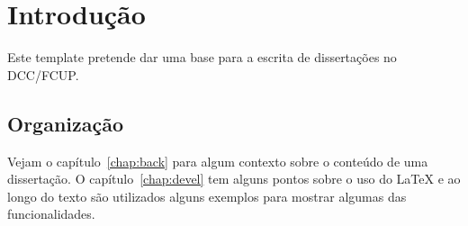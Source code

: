 \chapter{Introdução}\label{chap:intro}

Este template pretende dar uma base para a escrita de dissertações no \ac{DCC}/\ac{FCUP}.

\section{Organização}
Vejam o capítulo~\ref{chap:back} para algum contexto sobre o conteúdo de uma dissertação. O capítulo~\ref{chap:devel} tem alguns pontos sobre o uso do {\LaTeX} e ao longo do texto são utilizados alguns exemplos para mostrar algumas das funcionalidades.




